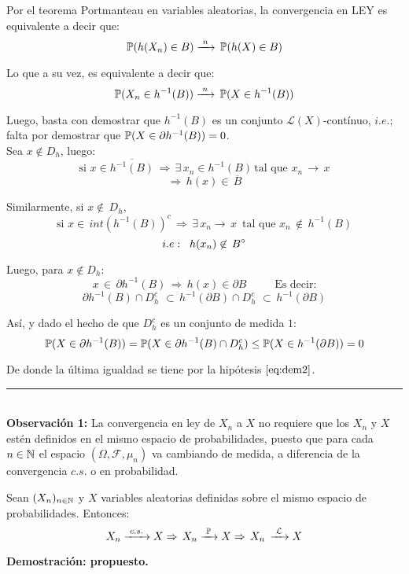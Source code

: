 Por el teorema Portmanteau en variables aleatorias, la convergencia en LEY es equivalente a decir que:
\[\mathbb{P}(h(X_n)\in B) \xrightarrow{\,\,n\,\,}\,\mathbb{P}(h(X)\in B)\]

Lo que a su vez, es equivalente a decir que:
\[\mathbb{P}(X_n \in h^{-1}(B)) \xrightarrow{\,\,n\,\,}\,\mathbb{P}(X \in h^{-1}(B))\]

Luego, basta con demostrar que $h^{-1}(B)$ es un conjunto $\mathcal{L}(X)$-contínuo, $i.e.$; falta por demostrar que $\mathbb{P}(X \in \partial h^{-1}(B)) =0$.\\

Sea $x \not\in D_h$, luego:
\[\text{si }x\in\overline{h^{-1}(B)}\,\Rightarrow\,\exists\,x_n \in h^{-1}(B)\,\text{tal que }x_n\,\rightarrow\,x\]
\[\Rightarrow\,h(x)\in\,\overline{B}\]

Similarmente, si $x\not\in\,D_h$,
\[\text{si }x\in\,int\left(h^{-1}(B)\right)^{c}\,\Rightarrow\,\exists\,x_n \rightarrow\,x\,\text{ tal que  }x_n\,\not\in\,h^{-1}(B)\]
\[i.e:\hspace{0.2cm}h(x_n)\not\in\,B^{\circ}\]

Luego, para $x\not\in D_h$:
\[x\,\in\,\partial h^{-1}(B) \,\Rightarrow\,h(x)\in\partial B\,\hspace{1cm}\text{Es decir:}\]
\[\partial h^{-1}(B) \cap D_h^{c}\,\,\subset\,h^{-1}(\partial B)\cap D_h^{c}\,\,\subset\,h^{-1}(\partial B)\]

Así, y dado el hecho de que $D_h^{c}$ es un conjunto de medida $1$:
\[\mathbb{P}(X \in \partial h^{-1}(B)) = \mathbb{P}(X \in \partial h^{-1}(B) \cap D_h^{c}) \leq \mathbb{P}(X \in h^{-1}(\partial B))=0\]

De donde la última igualdad se tiene por la hipótesis $\ref{eq:dem2}$.
\rule{0.7em}{0.7em}\\\newline
\textbf{Observación 1:} La convergencia en ley de $X_n$ a $X$ no requiere que los $X_n$ y $X$ estén definidos en el mismo espacio de probabilidades, puesto que para cada $n\in\mathbb N$ el espacio $(\Omega,\mathcal{F},\mu_n)$ va cambiando de medida, a diferencia de la convergencia $c.s.$ o en probabilidad.

\begin{prop}
Sean $(X_n)_{n\in\mathbb N}$ y $X$ variables aleatorias definidas sobre el mismo espacio de probabilidades. Entonces:
\[X_n\xrightarrow{\,\,c.s.\,\,} X \Rightarrow\,X_n \xrightarrow{\,\,\mathbb{P}\,\,}X \Rightarrow\,X_n\,\xrightarrow{\,\,\mathcal{L}\,\,}X\]
\end{prop}
\textbf{Demostración: propuesto.}

